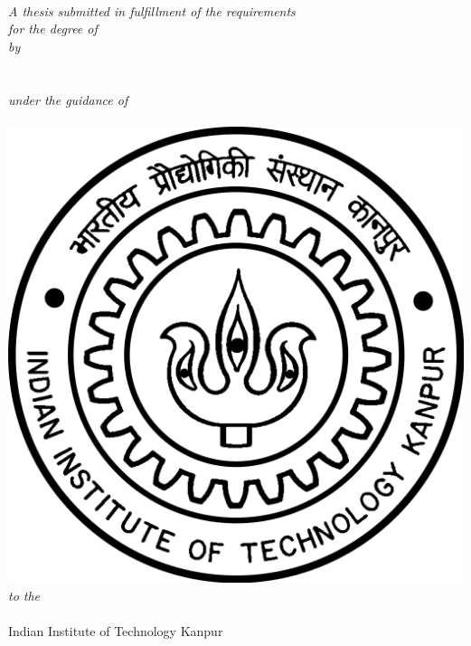 \begin{titlepage}
	\begin{center}
		\vspace*{0.1cm}
		
		\hrulefill \\
		\huge
		\textbf{\thesistitle}\\
		\hrulefill \\
		\Large
		\textit{A thesis submitted in fulfillment of the requirements} \\
		\textit{ for the degree of \degreename}\\
		\textit{by}\\
		\textbf{\authorname}\\
		\textbf{\authorrollno}\\
		\textit{under the guidance of}\\
		\supname\\
		\vspace{1.5cm}
		{\includegraphics[scale = 0.1]{images/IITKlogo.png}}\\
		\textit{to the}\\
		\textbf{\deptname}\\
		Indian Institute of Technology Kanpur\\
		\datesubmission\\
		\vspace{1cm}
	
	\end{center}
\end{titlepage}
